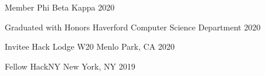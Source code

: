 
\begin{cvhonors}

  \cvhonor
    {Member}
    {Phi Beta Kappa}
    {}
    {2020}

  \cvhonor
    {Graduated with Honors}
    {Haverford Computer Science Department}
    {}
    {2020}

  \cvhonor
    {Invitee}
    {Hack Lodge W20}
    {Menlo Park, CA}
    {2020}

  \cvhonor
    {Fellow}
    {HackNY}
    {New York, NY}
    {2019}

\end{cvhonors}
